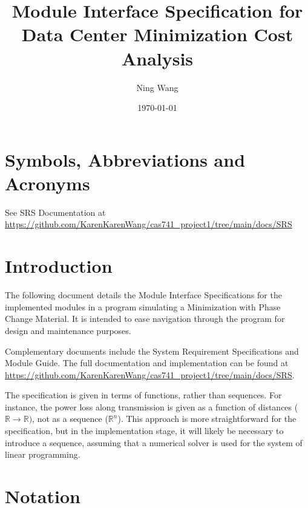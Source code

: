 \documentclass[12pt, titlepage]{article}
\begin{document}
\title{Module Interface Specification for Data Center Minimization Cost Analysis}

\author{Ning Wang}

\date{\today}

\maketitle


\newpage

\tableofcontents

\newpage

\section{Symbols, Abbreviations and Acronyms}

    See SRS Documentation at \url{https://github.com/KarenKarenWang/cas741_project1/tree/main/docs/SRS}


\section{Introduction}

The following document details the Module Interface Specifications for the
implemented modules in a program simulating a Minimization with
Phase Change Material.  It is intended to ease navigation through the program
for design and maintenance purposes.

Complementary documents include the System Requirement Specifications
and Module Guide.  The full documentation and implementation can be
found at \url{https://github.com/KarenKarenWang/cas741_project1/tree/main/docs/SRS}.

The specification is given in terms of functions, rather than sequences.  For
instance, the power loss along transmission is given as a function of distances
($\mathbb{R} \rightarrow \mathbb{R})$, not as a sequence ($\mathbb{R}^n$).  This
approach is more straightforward for the specification, but in the
implementation stage, it will likely be necessary to introduce a
sequence, assuming that a numerical solver is used for the system of linear programming.

\section{Notation}
\end{document}
